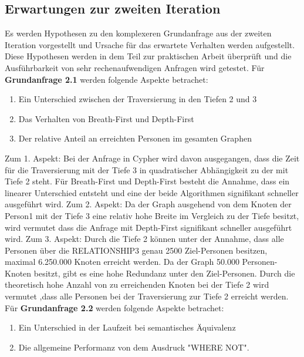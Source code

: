 \subsection{Erwartungen zur zweiten Iteration}
Es werden Hypothesen zu den komplexeren Grundanfrage aus der zweiten Iteration vorgestellt und Ursache für das erwartete Verhalten werden aufgestellt. Diese Hypothesen werden in dem Teil zur praktischen Arbeit überprüft und die Ausführbarkeit von sehr rechenaufwendigen Anfragen wird getestet.  \newline \newline
Für \textbf{Grundanfrage 2.1} werden folgende Aspekte betrachet: 
\begin{enumerate}
	\item Ein Unterschied zwischen der Traversierung in den Tiefen 2 und 3 
	\item Das Verhalten von Breath-First und Depth-First
	\item Der relative Anteil an erreichten Personen im gesamten Graphen
\end{enumerate}
Zum 1. Aspekt: Bei der Anfrage in Cypher wird davon ausgegangen, dass die Zeit für die Traversierung mit der Tiefe 3 in quadratischer Abhängigkeit zu der  mit Tiefe 2 steht. Für  Breath-First und Depth-First besteht die Annahme, dass ein linearer Unterschied entsteht  und eine der beide Algorithmen signifikant schneller ausgeführt wird. \newline
Zum 2. Aspekt: Da der Graph ausgehend von dem Knoten der Person1 mit der Tiefe 3 eine relativ hohe Breite im Vergleich zu der Tiefe besitzt, wird vermutet dass die Anfrage mit Depth-First signifikant schneller  ausgeführt wird. \newline
Zum 3. Aspekt: Durch die Tiefe 2 können  unter der Annahme, dass alle Personen über die RELATIONSHIP3 genau 2500 Ziel-Personen besitzen, maximal 6.250.000 Knoten erreicht werden. Da der Graph 50.000 Personen-Knoten besitzt, gibt es eine hohe Redundanz unter den Ziel-Personen. Durch die theoretisch hohe Anzahl von zu erreichenden Knoten bei der Tiefe 2 wird vermutet ,dass alle Personen bei der Traversierung zur Tiefe 2 erreicht werden. \newline \newline
Für \textbf{Grundanfrage 2.2} werden folgende Aspekte betrachet: 
\begin{enumerate}
	\item Ein Unterschied in der Laufzeit bei  semantisches Äquivalenz  
	\item Die allgemeine Performanz von dem Ausdruck "WHERE NOT".
\end{enumerate}
